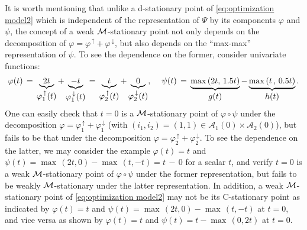 \documentclass{siamart}
\newcommand{\epc}{\hspace{1pc}}
\begin{document}
It is worth mentioning that unlike a d-stationary point of \eqref{eq:optimization model2} which is independent
of the representation of $\Psi$ by its components $\varphi$ and $\psi$, the concept of a weak ${\cal M}$-stationary point
not only depends on the decomposition of $\varphi = \varphi^{\, \uparrow} + \varphi^{\, \downarrow}$, but also depends on
the ``max-max'' representation of $\psi$.  To see the dependence on the former,
consider univariate functions:
{\small \[
\varphi(t)  \,= \,\underbrace{2t}_{\mbox{$\varphi^{\, \uparrow}_1(t)$}} + \underbrace{-t}_{\mbox{$\varphi^{\, \downarrow}_1(t)$}}
\, = \, \underbrace{t}_{\mbox{$\varphi^{\, \uparrow}_2(t)$}} +
\underbrace{0}_{\mbox{$\varphi^{\, \downarrow}_2(t)$}},\epc \psi(t) \,= \,
\underbrace{\max\,(2t, \, 1.5t )}_{\mbox{$g(t)$}} - \underbrace{\max\,(t\,,\, 0.5t)}_{\mbox{$h(t)$}}.
\]
}
One can easily check that $t=0$ is a ${\cal M}$-stationary point of $\varphi \circ \psi$ under the decomposition
$\varphi = \varphi_1^{\, \uparrow} + \varphi_1^{\, \downarrow}$ (with $(i_1, i_2) = (1,1)\in \mathcal{A}_1(0)\times \mathcal{A}_2(0)$),
but fails to be that under the decomposition $\varphi = \varphi_2^{\, \uparrow} + \varphi_2^{\, \downarrow}$.
To see the dependence on the latter, we may consider the example $\varphi(t) = t$ and $\psi(t) = \max\,(2t, 0) - \max\,(t, -t) = t\,-\,0$ for a scalar $t$,
and verify $t=0$ is a weak ${\cal M}$-stationary point of $\varphi\circ \psi$ under the former representation, but fails to be weakly ${\cal M}$-stationary
under the latter representation.   In addition, a weak ${\cal M}$-stationary point of \eqref{eq:optimization model2} may not be its
C-stationary point as indicated by $\varphi(t) = t$ and $\psi(t) = \max\,(2t, 0) - \max\,(t, -t)$ at $t=0$,
and vice versa as shown by $\varphi(t) = t$ and $\psi(t) = t - \max\,(0,2t)$ at $t=0$.
%
%
%
%
%
\end{document}
